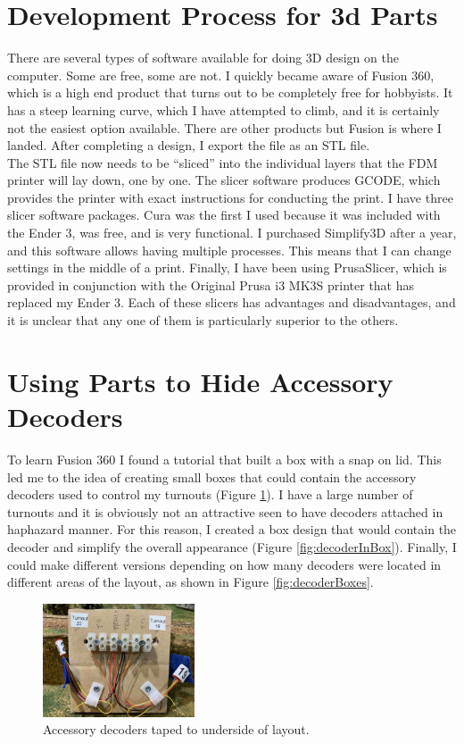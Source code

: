\section{Development Process for 3d Parts}

There are several types of software available for doing 3D design on the computer.  Some are free, some are not.  I quickly became aware of Fusion 360, which is a high
end product that turns out to be completely free for hobbyists.  It has a steep learning curve, which I have attempted to climb, and it is certainly not the easiest option
available.  There are other products but Fusion is where I landed.  After completing a design, I export the file as an STL file.\\

The STL file now needs to be ``sliced'' into the individual layers that the FDM printer will lay down, one by one. The slicer software produces GCODE, which provides the printer with exact instructions for conducting the print.  I have three slicer software packages.  Cura was the first I used because it was included with the Ender 3, was free, and is very functional.  I purchased Simplify3D after a year, and this software allows having multiple processes.  This means that I can change settings in the middle of a print.  Finally, I have been using PrusaSlicer, which is provided in conjunction with the Original Prusa i3 MK3S printer that has replaced my Ender 3.  Each of these slicers has advantages and disadvantages, and it is unclear that any one of them is particularly superior to the others.\\

\section{Using Parts to Hide Accessory Decoders}
To learn Fusion 360 I found a tutorial that built a box with a snap on lid.  This led me to the idea of creating small boxes that could
contain the accessory decoders used to control my turnouts (Figure \ref{fig:naked}).  I have a large number of turnouts and it is obviously not an attractive seen to have decoders attached in haphazard manner.  For this reason, I created a box design that would contain the decoder and simplify the overall appearance (Figure \ref{fig:decoderInBox}).  Finally, I could make different versions depending on how many decoders were located in different areas of the layout, as shown in Figure \ref{fig:decoderBoxes}.

	\begin{figure}[htbp]
	\centering
	\includegraphics[width=0.4\textwidth]{./figures/printer/TwoNakedDecoders.jpg}
	\caption{Accessory decoders taped to underside of layout.}
	\label{fig:naked}
	\end{figure}
	
